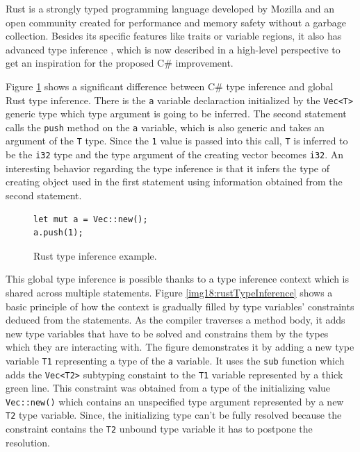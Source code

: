 Rust is a strongly typed programming language developed by Mozilla and an open community created for performance and memory safety without a garbage collection. 
Besides its specific features like traits or variable regions, it also has advanced type inference \cite{online:rustTypeInference}, which is now described in a high-level perspective to get an inspiration for the proposed C\# improvement.
\par
Figure \ref{img17:rustCodeExample} shows a significant difference between C\# type inference and global Rust type inference.
There is the \texttt{a} variable declaraction initialized by the \texttt{Vec<T>} generic type which type argument is going to be inferred.
The second statement calls the \texttt{push} method on the \texttt{a} variable, which is also generic and takes an argument of the \texttt{T} type.
Since the \texttt{1} value is passed into this call, \texttt{T} is inferred to be the \texttt{i32} type and the type argument of the creating vector becomes \texttt{i32}.
An interesting behavior regarding the type inference is that it infers the type of creating object used in the first statement using information obtained from the second statement.
\begin{figure}[h]
\begin{lstlisting}
let mut a = Vec::new();
a.push(1);
\end{lstlisting}
\caption{Rust type inference example.}
\label{img17:rustCodeExample}
\end{figure}
\par
This global type inference is possible thanks to a type inference context which is shared across multiple statements. 
Figure \ref{img18:rustTypeInference} shows a basic principle of how the context is gradually filled by type variables' constraints deduced from the statements.   
As the compiler traverses a method body, it adds new type variables that have to be solved and constrains them by the types which they are interacting with. 
The figure demonstrates it by adding a new type variable \texttt{T1} representing a type of the \texttt{a} variable.
It uses the \texttt{sub} function which adds the \texttt{Vec<T2>} subtyping constaint to the \texttt{T1} variable represented by a thick green line.
This constraint was obtained from a type of the initializing value \texttt{Vec::new()} which contains an unspecified type argument represented by a new \texttt{T2} type variable.
Since, the initializing type can't be fully resolved because the constraint contains the \texttt{T2} unbound type variable it has to postpone the resolution.
